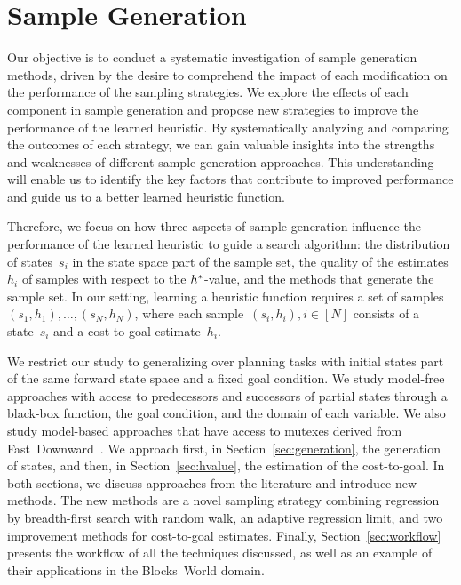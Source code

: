\chapter{Sample Generation}
\label{sec:sampling}

Our objective is to conduct a systematic investigation of sample generation methods, driven by the desire to comprehend the impact of each modification on the performance of the sampling strategies. We explore the effects of each component in sample generation and propose new strategies to improve the performance of the learned heuristic. By systematically analyzing and comparing the outcomes of each strategy, we can gain valuable insights into the strengths and weaknesses of different sample generation approaches. This understanding will enable us to identify the key factors that contribute to improved performance and guide us to a better learned heuristic function.

Therefore, we focus on how three aspects of sample generation influence the performance of the learned heuristic to guide a search algorithm: the distribution of states~$s_i$ in the state space part of the sample set, the quality of the estimates~$h_i$ of samples with respect to the $h^{*}$-value, and the methods that generate the sample set. In our setting, learning a heuristic function requires a set of samples~$(s_1,h_1),\ldots,(s_N,h_N)$, where each sample~$(s_i,h_i), i\in[N]$ consists of a state~$s_i$ and a cost-to-goal estimate~$h_i$.

We restrict our study to generalizing over planning tasks with initial states part of the same forward state space and a fixed goal condition. We study model-free approaches with access to predecessors and successors of partial states through a black-box function, the goal condition, and the domain of each variable. We also study model-based approaches that have access to mutexes derived from Fast~Downward~\cite{Helmert/2006}. We approach first, in Section~\ref{sec:generation}, the generation of states, and then, in Section~\ref{sec:hvalue}, the estimation of the cost-to-goal. In both sections, we discuss approaches from the literature and introduce new methods. The new methods are a novel sampling strategy combining regression by breadth-first search with random walk, an adaptive regression limit, and two improvement methods for cost-to-goal estimates. Finally, Section~\ref{sec:workflow} presents the workflow of all the techniques discussed, as well as an example of their applications in the Blocks~World domain.

